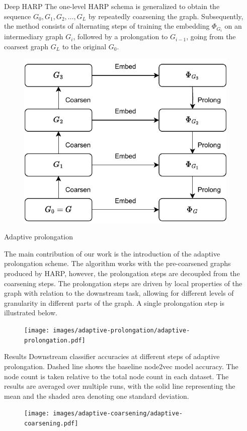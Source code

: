\documentclass{beamer}
\newlength{\sepwidth}
\newlength{\colwidth}
\newcommand{\separatorcolumn}{\begin{column}{\sepwidth}\end{column}}
\begin{document}
\begin{frame}[t]
\begin{columns}[t]
	\separatorcolumn

	\begin{column}{\colwidth}
		\begin{block}{Deep HARP}
			The one-level HARP schema is generalized to obtain the sequence \( G_0, G_1, G_2, \dots, G_L \) by repeatedly coarsening the graph. Subsequently, the method consists of alternating steps of training the embedding \( \Phi_{G_i} \) on an intermediary graph \( G_i \), followed by a prolongation to \( G_{i - 1} \), going from the coarsest graph \( G_L \) to the original \( G_0 \).
			\begin{figure}
				\includegraphics[width=0.45\linewidth]{images/deep-harp/deep-harp.pdf}
			\end{figure}
		\end{block}

		\begin{block}{Adaptive prolongation}

			The main contribution of our work is the introduction of the adaptive prolongation scheme. The algorithm works with the pre-coarsened graphs produced by HARP, however, the prolongation steps are decoupled from the coarsening steps. The prolongation steps are driven by local properties of the graph with relation to the downstream task, allowing for different levels of granularity in different parts of the graph. A single prolongation step is illustrated below.

			\begin{figure}
				\texttt{[image: images/adaptive-prolongation/adaptive-prolongation.pdf]}
			\end{figure}
		\end{block}

		\begin{block}{Results}
			Downstream classifier accuracies at different steps of adaptive prolongation. Dashed line shows the baseline node2vec model accuracy. The node count is taken relative to the total node count in each dataset. The results are averaged over multiple runs, with the solid line representing the mean and the shaded area denoting one standard deviation.
			\begin{figure}
				\texttt{[image: images/adaptive-coarsening/adaptive-coarsening.pdf]}
			\end{figure}
		\end{block}


\end{column}
\end{columns}
\end{frame}
\end{document}
